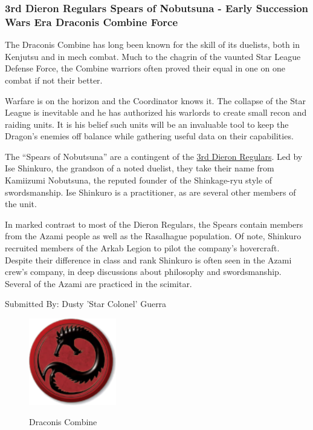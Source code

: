 \subsubsection{3rd Dieron Regulars Spears of Nobutsuna - Early Succession Wars Era Draconis Combine Force}

The Draconis Combine has long been known for the skill of its duelists, both in Kenjutsu and in mech combat.
Much to the chagrin of the vaunted Star League Defense Force, the Combine warriors often proved their equal in one on one combat if not their better.

Warfare is on the horizon and the Coordinator knows it.
The collapse of the Star League is inevitable and he has authorized his warlords to create small recon and raiding units.
It is his belief such units will be an invaluable tool to keep the Dragon’s enemies off balance while gathering useful data on their capabilities.

The “Spears of Nobutsuna” are a contingent of the \href{https://www.sarna.net/wiki/3rd_Dieron_Regulars}{3rd Dieron Regulars}.
Led by Ise Shinkuro, the grandson of a noted duelist, they take their name from Kamiizumi Nobutsuna, the reputed founder of the Shinkage-ryu style of swordsmanship.
Ise Shinkuro is a practitioner, as are several other members of the unit.

In marked contrast to most of the Dieron Regulars, the Spears contain members from the Azami people as well as the Rasalhague population.
Of note, Shinkuro recruited members of the Arkab Legion to pilot the company’s hovercraft.
Despite their difference in class and rank Shinkuro is often seen in the Azami crew’s company, in deep discussions about philosophy and swordsmanship.
Several of the Azami are practiced in the scimitar. 

Submitted By: Dusty 'Star Colonel' Guerra

\begin{figure}[!h]
  \centering
  \includegraphics[alt='Draconis Combine Logo', width=1.5in, height=1.486in]{img/Draconis-Combine.png}
  \caption*{Draconis Combine}
\end{figure}

